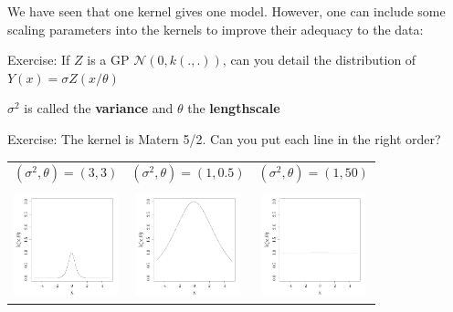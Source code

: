 \documentclass{beamer}
\begin{document}
\begin{frame}{}
We have seen that one kernel gives one model. However, one can include some scaling parameters into the kernels to improve their adequacy to the data:
\begin{exampleblock}{Exercise:}
If $Z$ is a GP $\mathcal{N}(0,k(.,.))$, can you detail the distribution of $Y(x) = \sigma Z(x/\theta)$
\end{exampleblock}
\vspace{5mm}
$\sigma^2$ is called the \textbf{variance} and $\theta$ the \textbf{lengthscale}
\end{frame}

\begin{frame}{}
\begin{exampleblock}{Exercise: }
The kernel is Matern 5/2. Can you put each line in the right order?
\begin{center}
\begin{tabular}{ccc}
$(\sigma^2,\theta) = (3,3)$& $(\sigma^2,\theta)=(1,0.5)$& $(\sigma^2,\theta)=(1,50)$ \\ 
&&\\
\includegraphics[height=3cm]{figures/R/MVN_kern105} &\includegraphics[height=3cm]{figures/R/MVN_kern33}& \includegraphics[height=3cm]{figures/R/MVN_kern150}\\ 

\end{tabular}
\end{center}
\end{exampleblock}
\end{frame}
\end{document}
